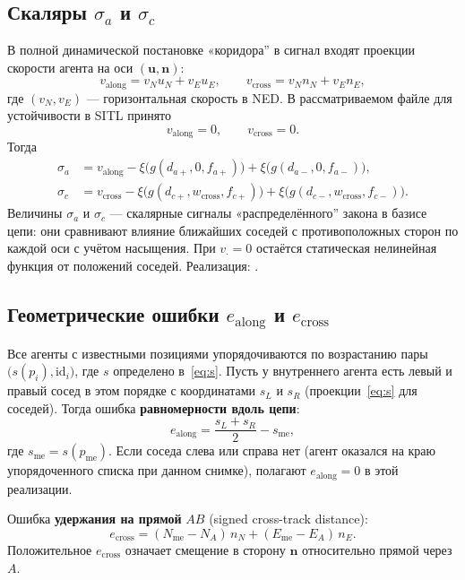 \documentclass[a4paper,11pt]{article}
\newcommand{\code}[1]{\texttt{\detokenize{#1}}}
\begin{document}
\subsection{Скаляры $\sigma_a$ и $\sigma_c$}
В полной динамической постановке «коридора'' в сигнал входят проекции скорости агента на оси $(\mathbf{u},\mathbf{n})$:
\begin{equation}
v_{\mathrm{along}} = v_N u_N + v_E u_E,\qquad
v_{\mathrm{cross}} = v_N n_N + v_E n_E,
\end{equation}
где $(v_N,v_E)$ --- горизонтальная скорость в NED. В рассматриваемом файле для устойчивости в SITL принято
\begin{equation}
v_{\mathrm{along}} = 0,\qquad v_{\mathrm{cross}} = 0.
\end{equation}
Тогда
\begin{align}
\label{eq:sigma}
\sigma_a &= v_{\mathrm{along}} - \xi\bigl(g(d_{a+},0,f_{a+})\bigr) + \xi\bigl(g(d_{a-},0,f_{a-})\bigr),\\
\sigma_c &= v_{\mathrm{cross}} - \xi\bigl(g(d_{c+},w_{\mathrm{cross}},f_{c+})\bigr) + \xi\bigl(g(d_{c-},w_{\mathrm{cross}},f_{c-})\bigr).
\end{align}
Величины $\sigma_a$ и $\sigma_c$ --- скалярные сигналы «распределённого'' закона в базисе цепи: они сравнивают влияние ближайших соседей с противоположных сторон по каждой оси с учётом насыщения. При $v_{\cdot}=0$ остаётся статическая нелинейная функция от положений соседей. Реализация: \code{\_sigmas\_segment\_frame}.

\subsection{Геометрические ошибки $e_{\mathrm{along}}$ и $e_{\mathrm{cross}}$}
Все агенты с известными позициями упорядочиваются по возрастанию пары $\bigl(s(p_i),\mathrm{id}_i\bigr)$, где $s$ определено в~\eqref{eq:s}. Пусть у внутреннего агента есть левый и правый сосед в этом порядке с координатами $s_L$ и $s_R$ (проекции~\eqref{eq:s} для соседей). Тогда ошибка \textbf{равномерности вдоль цепи}:
\begin{equation}
\label{eq:ealong}
e_{\mathrm{along}} = \frac{s_L + s_R}{2} - s_{\mathrm{me}},
\end{equation}
где $s_{\mathrm{me}} = s(p_{\mathrm{me}})$. Если соседа слева или справа нет (агент оказался на краю упорядоченного списка при данном снимке), полагают $e_{\mathrm{along}}=0$ в этой реализации.

Ошибка \textbf{удержания на прямой} $AB$ (signed cross-track distance):
\begin{equation}
\label{eq:ecross}
e_{\mathrm{cross}} = (N_{\mathrm{me}}-N_A)\, n_N + (E_{\mathrm{me}}-E_A)\, n_E .
\end{equation}
Положительное $e_{\mathrm{cross}}$ означает смещение в сторону $\mathbf{n}$ относительно прямой через~$A$.
\end{document}
